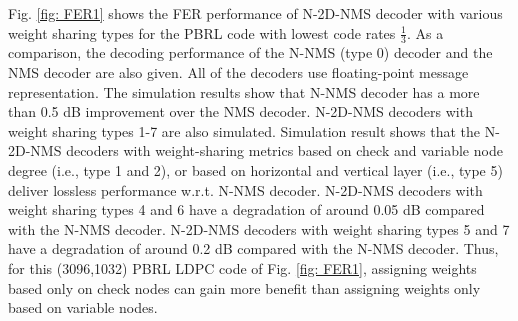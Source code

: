 \documentclass [PhD] {uclathes}
\begin{document}
Fig. \ref{fig: FER1} shows the FER performance of  N-2D-NMS decoder with various weight sharing types for the PBRL code with lowest code rates $\frac{1}{3}$. As a comparison, the decoding performance of the N-NMS (type 0) decoder and the NMS decoder are also given. All of the decoders use floating-point message representation. The simulation results show that N-NMS decoder has a more than 0.5 dB improvement over the NMS decoder. N-2D-NMS decoders with weight sharing types 1-7  are also simulated. 
Simulation result shows that the N-2D-NMS decoders with weight-sharing metrics based on check and variable node degree (i.e., type 1 and 2), or based on horizontal and vertical layer  (i.e., type 5) deliver lossless performance w.r.t. N-NMS decoder.  N-2D-NMS decoders with weight sharing types 4 and 6 have a degradation of around 0.05 dB compared with the N-NMS decoder.  N-2D-NMS decoders with weight sharing types 5 and 7 have a degradation of around 0.2 dB compared with the N-NMS decoder. Thus, for this (3096,1032) PBRL LDPC code of Fig. \ref{fig: FER1}, assigning weights based only on check nodes can gain more benefit than assigning weights only based on variable nodes.
\end{document}
